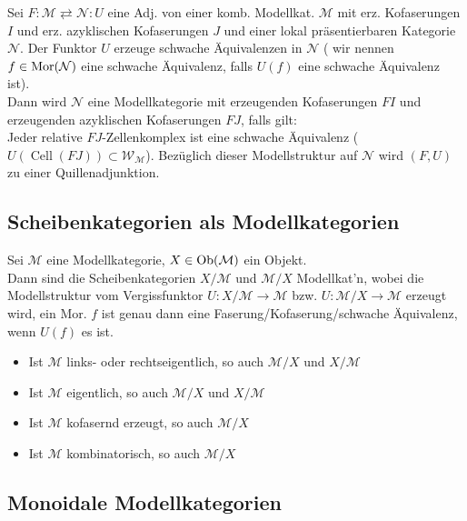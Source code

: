 \documentclass{cheat-sheet}
\newcommand{\Weak}{\mathcal{W}} %
\newcommand{\ModC}{\mathcal{M}} %
\newcommand{\NodC}{\mathcal{N}} %
\DeclareMathOperator{\Cell}{Cell} %
\begin{document}
\begin{satz}
  Sei $F : \ModC \rightleftarrows \NodC : U$ eine Adj. von einer komb. Modellkat. $\ModC$ mit erz. Kofaserungen $I$ und erz. azyklischen Kofaserungen $J$ und einer lokal präsentierbaren Kategorie $\NodC$.
  Der Funktor $U$ erzeuge schwache Äquivalenzen in $\NodC$ (\dh{} wir nennen $f \in \Mor(\NodC)$ eine schwache Äquivalenz, falls $U(f)$ eine schwache Äquivalenz ist). \\
  Dann wird $\NodC$ eine Modellkategorie mit erzeugenden Kofaserungen $FI$ und erzeugenden azyklischen Kofaserungen $FJ$, falls gilt: \\
  Jeder relative $FJ$-Zellenkomplex ist eine schwache Äquivalenz (\dh{} $U(\Cell(FJ)) \subset \Weak_\ModC$).
  Bezüglich dieser Modellstruktur auf $\NodC$ wird $(F, U)$ zu einer Quillenadjunktion.
\end{satz}

\subsection{Scheibenkategorien als Modellkategorien}

\begin{lem}
  Sei $\ModC$ eine Modellkategorie, $X \in \Ob(\ModC)$ ein Objekt. \\
  Dann sind die Scheibenkategorien $X/\ModC$ und $\ModC/X$ Modellkat'n, wobei die Modellstruktur vom Vergissfunktor $U : X/\ModC \to \ModC$ bzw. $U : \ModC/X \to \ModC$ erzeugt wird, \dh{} ein Mor. $f$ ist genau dann eine Faserung/Kofaserung/schwache Äquivalenz, wenn $U(f)$ es ist.
\end{lem}

\begin{lem}
  \begin{itemize}
    \item Ist $\ModC$ links- oder rechtseigentlich, so auch $\ModC/X$ und $X/\ModC$
    \item Ist $\ModC$ eigentlich, so auch $\ModC/X$ und $X/\ModC$
    \item Ist $\ModC$ kofasernd erzeugt, so auch $\ModC/X$
    \item Ist $\ModC$ kombinatorisch, so auch $\ModC/X$
  \end{itemize}
\end{lem}

\subsection{Monoidale Modellkategorien}
\end{document}
